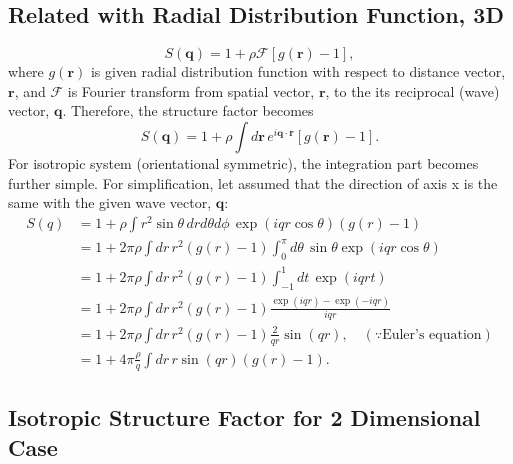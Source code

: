 \documentclass[10pt, a4paper]{article}
\begin{document}
\begin{appendices}
    \subsection{Related with Radial Distribution Function, 3D}
    \begin{equation}
      S(\mathbf{q}) = 1 + \rho\mathscr{F}\left[g(\mathbf{r}) - 1\right],
    \end{equation}
    where $g(\mathbf{r})$ is given radial distribution function with respect to distance vector, $\mathbf{r}$, and $\mathscr{F}$ is Fourier transform from spatial vector, $\mathbf{r}$, to the its reciprocal (wave) vector, $\mathbf{q}$. Therefore, the structure factor becomes
    \begin{equation}
      S(\mathbf{q}) = 1 + \rho \int d\mathbf{r}\, e^{i\mathbf{q}\cdot\mathbf{r}}\left[g(\mathbf{r}) - 1\right].
    \end{equation}
    For isotropic system (orientational symmetric), the integration part becomes further simple. For simplification, let assumed that the direction of axis x is the same with the given wave vector, $\mathbf{q}$:
    \begin{align}
      S(q) &= 1 + \rho \int r^2\sin\theta \,dr d\theta d\phi\, \exp(iqr\cos\theta)(g(r) - 1)  \nonumber\\
           &= 1 + 2\pi\rho \int dr \,r^2(g(r) - 1) \int_0^{\pi} d\theta \,\sin\theta\exp\left(iqr\cos\theta\right) \nonumber\\
           &= 1 + 2\pi \rho \int dr \,r^2(g(r) - 1) \int_{-1}^{1}dt \,\exp(iqrt) \nonumber\\
           &= 1 + 2\pi \rho \int dr \,r^2(g(r) - 1) \frac{\exp(iqr)-\exp(-iqr)}{iqr} \nonumber\\
           &= 1 + 2\pi \rho \int dr \,r^2(g(r) - 1) \frac{2}{qr}\sin(qr), \quad(\because\textrm{Euler's equation})\nonumber\\
           &= 1 + 4\pi \frac{\rho}{q} \int dr \,r\sin(qr)(g(r) - 1).
    \end{align}

    \subsection{Isotropic Structure Factor for 2 Dimensional Case}


\end{appendices}
\end{document}
